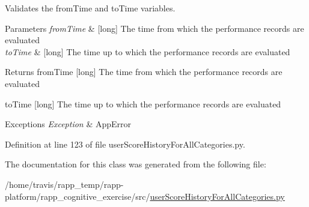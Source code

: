 Validates the from\-Time and to\-Time variables. 


\begin{DoxyParams}{Parameters}
{\em from\-Time} & \mbox{[}long\mbox{]} The time from which the performance records are evaluated \\
\hline
{\em to\-Time} & \mbox{[}long\mbox{]} The time up to which the performance records are evaluated\\
\hline
\end{DoxyParams}
\begin{DoxyReturn}{Returns}
from\-Time \mbox{[}long\mbox{]} The time from which the performance records are evaluated 

to\-Time \mbox{[}long\mbox{]} The time up to which the performance records are evaluated 
\end{DoxyReturn}

\begin{DoxyExceptions}{Exceptions}
{\em Exception} & App\-Error \\
\hline
\end{DoxyExceptions}


Definition at line 123 of file user\-Score\-History\-For\-All\-Categories.\-py.



The documentation for this class was generated from the following file\-:\begin{DoxyCompactItemize}
\item 
/home/travis/rapp\-\_\-temp/rapp-\/platform/rapp\-\_\-cognitive\-\_\-exercise/src/\hyperlink{userScoreHistoryForAllCategories_8py}{user\-Score\-History\-For\-All\-Categories.\-py}\end{DoxyCompactItemize}
